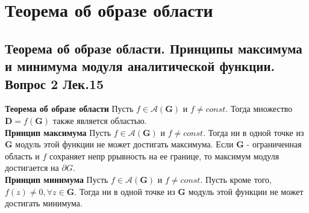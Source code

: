 \documentclass{article}
\begin{document}
\section{Теорема об образе области}
\subsection{Теорема об образе области. Принципы максимума и минимума модуля аналитической функции. Вопрос 2 Лек.15}
	\textbf{Теорема об образе области} Пусть $ f \in \mathcal{A}(\mathbf{G})$ и $f\ne const$. Тогда множество $\mathbf{D}=f(\mathbf{G})$ также является областью.\\
	\textbf{Принцип максимума} Пусть $ f \in \mathcal{A}(\mathbf{G})$ и $f\ne const$. Тогда ни в одной точке из $\mathbf{G}$ модуль этой функции не может достигать максимума. Если $\mathbf{G}$
	- ограниченная область и $ f $ сохраняет непр ррывность на ее границе, то максимум модуля достигается на $\partial G$.\\
	\textbf{Принцип минимума} Пусть $ f \in \mathcal{A}(\mathbf{G})$ и $f\ne const$. Пусть кроме того, $f(z)\ne 0, \forall z\in \mathbf{G}$. Тогда ни в одной точке из $\mathbf{G}$ модуль этой функции не может достигать минимума.
\end{document}
